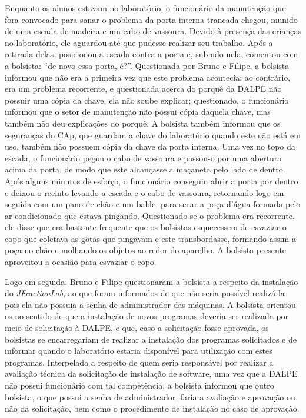 Enquanto os alunos estavam no laboratório, o funcionário da manutenção que fora convocado para sanar o problema da porta interna trancada chegou, munido de uma escada de madeira e um cabo de vassoura. Devido à presença das crianças no laboratório, ele aguardou até que pudesse realizar seu trabalho. Após a retirada delas, posicionou a escada contra a porta e, subindo nela, comentou com a bolsista: “de novo essa porta, é?”. Questionada por Bruno e Filipe, a bolsista informou que não era a primeira vez que este problema acontecia; ao contrário, era um problema recorrente, e questionada acerca do porquê da DALPE não possuir uma cópia da chave, ela não soube explicar; questionado, o funcionário informou que o setor de manutenção não possui cópia daquela chave, mas também não deu explicações do porquê. A bolsista também informou que os seguranças do CAp, que guardam a chave do laboratório quando este não está em uso, também não possuem cópia da chave da porta interna. Uma vez no topo da escada, o funcionário pegou o cabo de vassoura e passou-o por uma abertura acima da porta, de modo que este alcançasse a maçaneta pelo lado de dentro. Após alguns minutos de esforço, o funcionário conseguiu abrir a porta por dentro e deixou o recinto levando a escada e o cabo de vassoura, retornando logo em seguida com um pano de chão e um balde, para secar a poça d’água formada pelo ar condicionado que estava pingando. Questionado se o problema era recorrente, ele disse que era bastante frequente que os bolsistas esquecessem de esvaziar o copo que coletava as gotas que pingavam e este transbordasse, formando assim a poça no chão e molhando os objetos ao redor do aparelho. A bolsista presente aproveitou a ocasião para esvaziar o copo. 

Logo em seguida, Bruno e Filipe questionaram a bolsista a respeito da instalação do \textit{JFractionLab}, ao que foram informados de que não seria possível realizá-la pois ela não possuía a senha de administrador das máquinas. A bolsista orientou-os no sentido de que a instalação de novos programas deveria ser realizada por meio de solicitação à DALPE, e que, caso a solicitação fosse aprovada, os bolsistas se encarregariam de realizar a instalação dos programas solicitados e de informar quando o laboratório estaria disponível para utilização com estes programas. Interpelada a respeito de quem seria responsável por realizar a avaliação técnica da solicitação de instalação de software, uma vez que a DALPE não possui funcionário com tal competência, a bolsista informou que outro bolsista, o que possui a senha de administrador, faria a avaliação e aprovação ou não da solicitação, bem como o procedimento de instalação no caso de aprovação.

